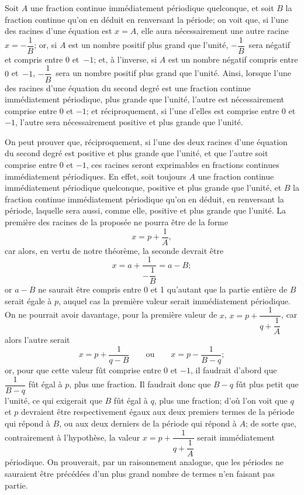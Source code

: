 \documentclass[leqno,12pt]{book}[2005/09/16]
\begin{document}
Soit $A$ une fraction continue immédiatement périodique quelconque,
et soit $B$ la fraction continue qu'on en déduit en renversant
la période; on voit que, si l'une des racines d'une équation
est $x = A$, elle aura nécessairement une autre racine $x = -\dfrac{1}{B}$;
or, si $A$ est un nombre positif plus grand que l'unité, $-\dfrac{1}{B}$~sera
négatif et compris entre $0$ et~$-1$; et, à l'inverse, si $A$ est un
nombre négatif compris entre $0$ et~$-1$, $-\dfrac{1}{B}$~sera un nombre positif
plus grand que l'unité. Ainsi, lorsque l'une des racines d'une
équation du second degré est une fraction continue immédiatement
périodique, plus grande que l'unité, l'autre est nécessairement
comprise entre $0$ et $-1$; et réciproquement, si l'une d'elles
est comprise entre $0$ et $-1$, l'autre sera nécessairement positive
et plus grande que l'unité.

On peut prouver que, réciproquement, si l'une des deux racines
d'une équation du second degré est positive et plus grande
que l'unité, et que l'autre soit comprise entre $0$ et $-1$, ces racines
seront exprimables en fractions continues immédiatement périodiques.
En effet, soit toujours $A$ une fraction continue immédiatement
périodique quelconque, positive et plus grande que
l'unité, et $B$ la fraction continue immédiatement périodique qu'on
en déduit, en renversant la période, laquelle sera aussi, comme
elle, positive et plus grande que l'unité. La première des racines
de la proposée ne pourra être de la forme
\[
  x = p + \frac{1}{A},
\]
car alors, en vertu de notre théorème, la seconde devrait être
\[
  x = a + \frac{1}{-\dfrac{1}{B}} = a - B ;
\]
or $a - B$ ne saurait être compris entre 0 et 1 qu'autant que la
partie entière de $B$ serait égale à $p$, auquel cas la première valeur
serait immédiatement périodique. On ne pourrait avoir davantage,
pour la première valeur de $x$, $x= p + \dfrac{1}{q + \dfrac{1}{A}}$, car alors l'autre
serait
\[
  x = p + \frac{1}{q - B} \qquad \text{ou} \qquad
  x = p - \frac{1}{B - q};
\]
or, pour que cette valeur fût comprise entre 0 et $-1$, il faudrait
d'abord que $\dfrac{1}{B-q}$ fût égal à $p$, plus une fraction. Il faudrait
donc que $B-q$ fût plus petit que l'unité, ce qui exigerait que $B$
fût égal à $q$, plus une fraction; d'où l'on voit que $q$ et $p$ devraient
être respectivement égaux aux deux premiers termes de la période
qui répond à $B$, ou aux deux derniers de la période qui répond à $A$;
de sorte que, contrairement à l'hypothèse, la valeur $x = p + \dfrac{1}{q + \dfrac{1}{A}}$
serait immédiatement périodique. On prouverait, par un raisonnement
analogue, que les périodes ne sauraient être précédées
d'un plus grand nombre de termes n'en faisant pas partie.
\end{document}
